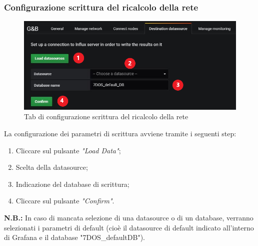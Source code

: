 \subsubsection{Configurazione scrittura del ricalcolo della rete}
\begin{figure} [H]
	\centering
	\includegraphics[scale=0.55]{Img/setds} 
	\caption{Tab di configurazione scrittura del ricalcolo della rete} \label{} 
\end{figure} 
La configurazione dei parametri di scrittura avviene tramite i seguenti step:
\begin{enumerate}
	\item Cliccare sul pulsante \emph{"Load Data"};
	\item Scelta della datasource;
	\item Indicazione del database di scrittura;
	\item Cliccare sul pulsante \emph{"Confirm"}.
\end{enumerate}

\textbf{N.B.:} In caso di mancata selezione di una datasource o di un database, verranno selezionati i parametri di default (cioè il datasource di default indicato all'interno di Grafana e il database "7DOS\_defaultDB").